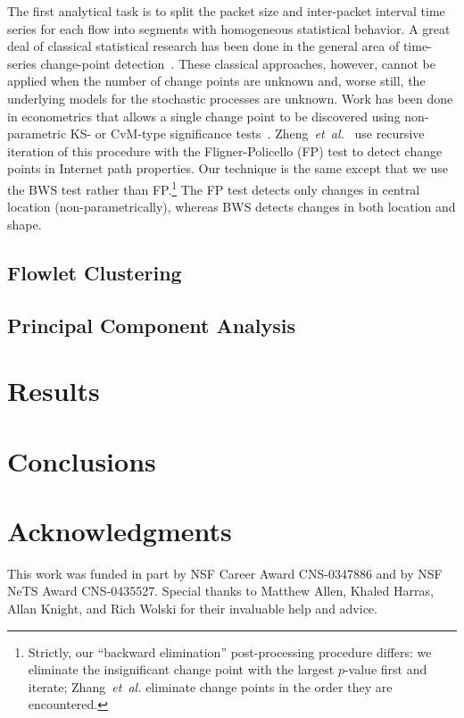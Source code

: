 \documentclass[conference]{IEEEtran}
\newcommand{\caps}[1]{{\small{#1}}}
\begin{document}
The first analytical task is to split the packet size and inter-packet interval time series for each flow into segments with homogeneous statistical behavior. A great deal of classical statistical research has been done in the general area of time-series change-point detection~\cite{Basseville93}. These classical approaches, however, cannot be applied when the number of change points are unknown and, worse still, the underlying models for the stochastic processes are unknown. Work has been done in econometrics that allows a single change point to be discovered using non-parametric \caps{KS}- or \caps{CvM}-type significance tests~\cite{Inoue01}. Zheng~\textit{et~al.}~\cite{Zhang01} use recursive iteration of this procedure with the Fligner-Policello (\caps{FP}) test to detect change points in Internet path properties.
Our technique is the same except that we use the \caps{BWS} test rather than \caps{FP}.\footnote{Strictly, our ``backward elimination'' post-processing procedure differs: we eliminate the insignificant change point with the largest $p$-value first and iterate; Zhang~\textit{et~al.} eliminate change points in the order they are encountered.}
The \caps{FP} test detects only changes in central location (non-parametrically), whereas \caps{BWS} detects changes in both location and shape.

\subsection{Flowlet Clustering}

\subsection{Principal Component Analysis}

\section{Results}\label{sec:results}

\section{Conclusions}\label{sec:conclusions}

\section{Acknowledgments}
This work was funded in part by NSF Career Award CNS-0347886 and by NSF NeTS Award CNS-0435527. Special thanks to Matthew Allen, Khaled Harras, Allan Knight, and Rich Wolski for their invaluable help and advice.


\end{document}
